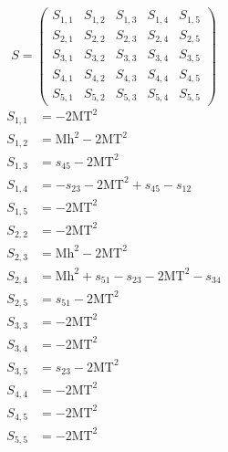 \documentclass[a4paper]{article}
\begin{document}
\begin{equation}
S=\left(\begin{array}{ccccc}
   S_{1,1}&
   S_{1,2}&
   S_{1,3}&
   S_{1,4}&
   S_{1,5}\\
   S_{2,1}&
   S_{2,2}&
   S_{2,3}&
   S_{2,4}&
   S_{2,5}\\
   S_{3,1}&
   S_{3,2}&
   S_{3,3}&
   S_{3,4}&
   S_{3,5}\\
   S_{4,1}&
   S_{4,2}&
   S_{4,3}&
   S_{4,4}&
   S_{4,5}\\
   S_{5,1}&
   S_{5,2}&
   S_{5,3}&
   S_{5,4}&
   S_{5,5}\end{array}\right)
\end{equation}
\begin{subequations}
\begin{align}
   S_{1,1}&=-2\text{MT}^2\\
   S_{1,2}&=\text{Mh}^2-2\text{MT}^2\\
   S_{1,3}&=s_{45}-2\text{MT}^2\\
   S_{1,4}&=-s_{23}-2\text{MT}^2+s_{45}-s_{12}\\
   S_{1,5}&=-2\text{MT}^2\\
   S_{2,2}&=-2\text{MT}^2\\
   S_{2,3}&=\text{Mh}^2-2\text{MT}^2\\
   S_{2,4}&=\text{Mh}^2+s_{51}-s_{23}-2\text{MT}^2-s_{34}\\
   S_{2,5}&=s_{51}-2\text{MT}^2\\
   S_{3,3}&=-2\text{MT}^2\\
   S_{3,4}&=-2\text{MT}^2\\
   S_{3,5}&=s_{23}-2\text{MT}^2\\
   S_{4,4}&=-2\text{MT}^2\\
   S_{4,5}&=-2\text{MT}^2\\
   S_{5,5}&=-2\text{MT}^2
\end{align}
\end{subequations}
\end{document}
